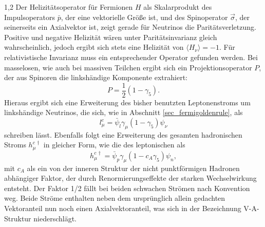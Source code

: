 \documentclass[11pt,a4paper,twoside]{report}
\begin{document}
\begin{spacing}{1,2}
\noindent
Der Helizitätsoperator für Fermionen $H$ als Skalarprodukt des Impulsoperators $\bar p$, der eine vektorielle Größe ist, und des Spinoperator $\vec \sigma$, 
der seinerseits ein Axialvektor ist, zeigt gerade für Neutrinos die Paritätsverletzung. Positive und negative Helizität wären unter
Paritätsinvarianz gleich wahrscheinlich, jedoch ergibt sich stets eine Helizität von $\langle H_\nu \rangle= -1$. Für relativistische
Invarianz muss ein entsprechender Operator gefunden werden. Bei masselosen, wie auch bei massiven Teilchen ergibt sich ein Projektionsoperator $P$, der aus Spinoren 
die linkshändige Komponente extrahiert:
\begin{equation}
 P = \frac12(1-\gamma_5).
\end{equation}
Hieraus ergibt sich eine Erweiterung des bisher benutzten Leptonenstroms um linkshändige Neutrinos, die sich, wie in Abschnitt \ref{sec_fermigoldenrule}, 
 als
\begin{equation}
 l_\mu^c = \bar \psi_l \gamma_\mu (1-\gamma_5) \psi_\nu
\end{equation}
schreiben lässt. Ebenfalls folgt eine Erweiterung des gesamten hadronischen Stroms $h_\mu^{c\,\dagger}$ in gleicher Form, wie die des leptonischen als
\begin{equation}
 h_\mu^{c\,\dagger} = \bar \psi_p \gamma_\mu(1-c_A\gamma_5)\psi_n,
\end{equation}
mit $c_A$ als ein von der inneren Struktur der nicht punktförmigen Hadronen abhängiger Faktor, der durch Renormierungseffekte der starken Wechselwirkung entsteht.
Der Faktor 1/2 fällt bei beiden schwachen Strömen nach Konvention weg. 
Beide Ströme enthalten neben dem ursprünglich allein gedachten Vektoranteil nun noch einen Axialvektoranteil, was sich in der Bezeichnung V-A-Struktur
niederschlägt.


\end{spacing}
\end{document}
